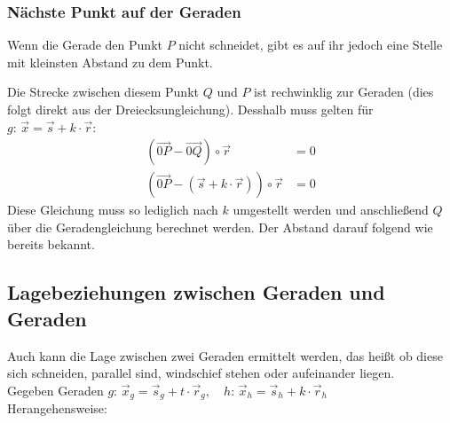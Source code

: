 \documentclass[a4paper,12pt]{article}
\begin{document}
	\subsubsection{Nächste Punkt auf der Geraden}
	Wenn die Gerade den Punkt $P$ nicht schneidet, gibt es auf ihr jedoch eine Stelle mit kleinsten Abstand zu dem Punkt.
	\begin{center}
	\end{center}
	Die Strecke zwischen diesem Punkt $Q$ und $P$ ist rechwinklig zur Geraden (dies folgt direkt aus der Dreiecksungleichung). Desshalb muss gelten für $g: \, \vec{x}= \vec{s} + k\cdot \vec{r}$:
		\begin{align*}
			(\vec{0P} - \vec{0Q})\circ \vec{r} &= 0\\
			(\vec{0P} - (\vec{s} + k\cdot \vec{r}))\circ \vec{r} &= 0
		\end{align*}
	Diese Gleichung muss so lediglich nach $k$ umgestellt werden und anschließend $Q$ über die Geradengleichung berechnet werden. Der Abstand darauf folgend wie bereits bekannt.
	\subsection{Lagebeziehungen zwischen Geraden und Geraden}
	Auch kann die Lage zwischen zwei Geraden ermittelt werden, das heißt ob diese sich schneiden, parallel sind, windschief stehen oder aufeinander liegen.\\
	Gegeben Geraden $g:\, \vec{x}_g = \vec{s}_g + t\cdot \vec{r}_g,\quad h:\, \vec{x}_h = \vec{s}_h + k\cdot \vec{r}_h$\\
	Herangehensweise:
\end{document}

